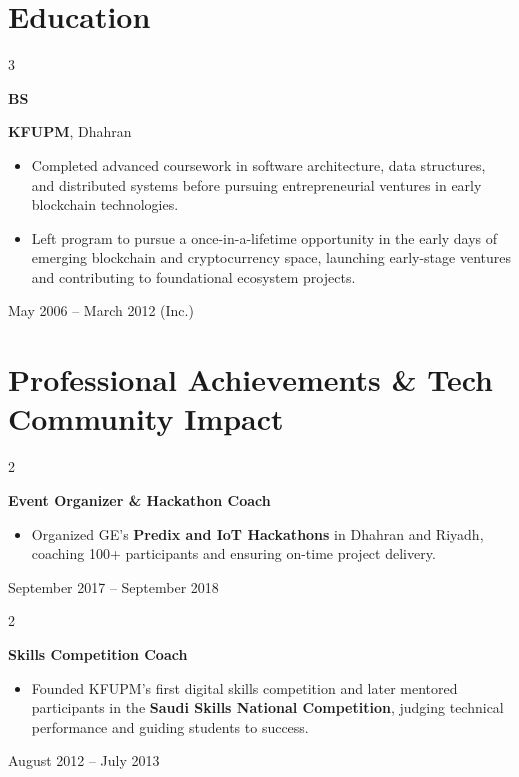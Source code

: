 \documentclass[10pt, letterpaper]{article}
\newenvironment{highlights}{
    \begin{itemize}[
        topsep=0.10 cm,
        parsep=0.10 cm,
        partopsep=0pt,
        itemsep=0pt,
        leftmargin=0.4 cm + 10pt
    ]
}{
    \end{itemize}
} %
\newenvironment{twocolentry}[2][]{
    \onecolentry
    \def\secondColumn{#2}
    \setcolumnwidth{\fill, 4.5 cm}
    \begin{paracol}{2}
}{
    \switchcolumn \raggedleft \secondColumn
    \end{paracol}
    \endonecolentry
} %
\newenvironment{threecolentry}[3][]{
    \onecolentry
    \def\thirdColumn{#3}
    \setcolumnwidth{1 cm, \fill, 4.5 cm}
    \begin{paracol}{3}
    {\raggedright #2} \switchcolumn
}{
    \switchcolumn \raggedleft \thirdColumn
    \end{paracol}
    \endonecolentry
} %
\begin{document}
    \section{Education}

    \begin{threecolentry}{\textbf{BS}}{
        May 2006 – March 2012 (Inc.)
    }
        \textbf{KFUPM}, Dhahran
        \begin{highlights}
            \item Completed advanced coursework in software architecture, data structures, and distributed systems before pursuing entrepreneurial ventures in early blockchain technologies.
            \item Left program to pursue a once-in-a-lifetime opportunity in the early days of emerging blockchain and cryptocurrency space, launching early-stage ventures and contributing to foundational ecosystem projects.
        \end{highlights}
    \end{threecolentry}

    \section{Professional Achievements \& Tech Community Impact}

    \begin{twocolentry}{
        September 2017 – September 2018
    }
        \textbf{Event Organizer \& Hackathon Coach}
        \begin{highlights}
            \item Organized GE's \textbf{Predix and IoT Hackathons} in Dhahran and Riyadh, coaching 100+ participants and ensuring on-time project delivery.
        \end{highlights}
    \end{twocolentry}

    \begin{twocolentry}{
        August 2012 – July 2013
    }
        \textbf{Skills Competition Coach}
        \begin{highlights}
            \item Founded KFUPM's first digital skills competition and later mentored participants in the \textbf{Saudi Skills National Competition}, judging technical performance and guiding students to success.
        \end{highlights}
    \end{twocolentry}
\end{document}
